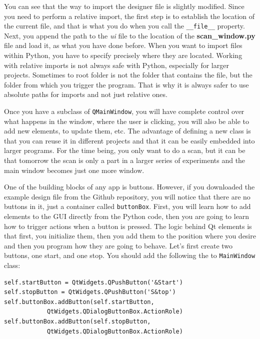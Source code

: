 You can see that the way to import the designer file is slightly
modified. Since you need to perform a relative import, the first step is
to establish the location of the current file, and that is what you do
when you call the \texttt{__file__} property. Next, you append the
path to the \emph{ui} file to the location of the
\textbf{scan\_window.py} file and load it, as what you have done before.
When you want to import files within Python, you have to specify
precisely where they are located. Working with relative imports is not
always safe with Python, especially for larger projects. Sometimes to
root folder is not the folder that contains the file, but the folder
from which you trigger the program. That is why it is always safer to
use absolute paths for imports and not just relative ones.

Once you have a subclass of \texttt{QMainWindow}, you will have complete
control over what happens in the window, where the user is clicking, you
will also be able to add new elements, to update them, etc. The advantage of defining a new class is that you can reuse it in different
projects and that it can be easily embedded into larger programs. For
the time being, you only want to do a scan, but it can be that tomorrow
the scan is only a part in a larger series of experiments and the main
window becomes just one more window.

One of the building blocks of any app is buttons. However, if you
downloaded the example design file from the Github repository, you will
notice that there are no buttons in it, just a container called
\texttt{buttonBox}. First, you will learn how to add elements to the
{GUI} directly from the Python code, then you are going to learn how to
trigger actions when a button is pressed. The logic behind Qt elements
is that first, you initialize them, then you add them to the position
where you desire and then you program how they are going to behave.
Let's first create two buttons, one start, and one stop. You should add
the following the to \texttt{MainWindow} class:

\begin{verbatim}
self.startButton = QtWidgets.QPushButton('&Start')
self.stopButton = QtWidgets.QPushButton('S&top')
self.buttonBox.addButton(self.startButton,
            QtWidgets.QDialogButtonBox.ActionRole)
self.buttonBox.addButton(self.stopButton,
            QtWidgets.QDialogButtonBox.ActionRole)
\end{verbatim}

